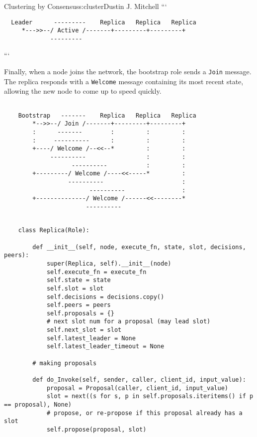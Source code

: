 \begin{aosachapter}{Clustering by Consensus}{s:cluster}{Dustin J. Mitchell}
```

\begin{verbatim}
  Leader      ---------    Replica   Replica   Replica
     *--->>--/ Active /-------+---------+---------+
             ---------
\end{verbatim}

```

Finally, when a node joins the network, the bootstrap role sends a
\texttt{Join} message. The replica responds with a \texttt{Welcome}
message containing its most recent state, allowing the new node to come
up to speed quickly.

\begin{verbatim}

    Bootstrap   -------    Replica   Replica   Replica
        *-->>--/ Join /-------+---------+---------+
        :      -------        :         :         :
        :     ----------      :         :         :
        +----/ Welcome /--<<--*         :         :
             ----------                 :         :
                   ----------           :         :
        +---------/ Welcome /----<<-----*         :
                  ----------                      :
                        ----------                :
        +--------------/ Welcome /------<<--------*
                       ----------
\end{verbatim}

\begin{verbatim}

    class Replica(Role):
    
        def __init__(self, node, execute_fn, state, slot, decisions, peers):
            super(Replica, self).__init__(node)
            self.execute_fn = execute_fn
            self.state = state
            self.slot = slot
            self.decisions = decisions.copy()
            self.peers = peers
            self.proposals = {}
            # next slot num for a proposal (may lead slot)
            self.next_slot = slot
            self.latest_leader = None
            self.latest_leader_timeout = None
    
        # making proposals
    
        def do_Invoke(self, sender, caller, client_id, input_value):
            proposal = Proposal(caller, client_id, input_value)
            slot = next((s for s, p in self.proposals.iteritems() if p == proposal), None)
            # propose, or re-propose if this proposal already has a slot
            self.propose(proposal, slot)
    

\end{verbatim}
\end{aosachapter}
